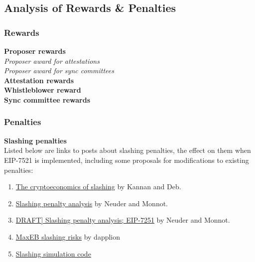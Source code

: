 \subsection{Analysis of Rewards \& Penalties}
\subsubsection{Rewards}

\textbf{Proposer rewards} \\
\noindent
\textit{Proposer award for attestations} \\


\noindent
\textit{Proposer award for sync committees} \\




\noindent
\textbf{Attestation rewards} \\



\noindent
\textbf{Whistleblower reward} \\


\noindent
\textbf{Sync committee rewards} \\


\subsubsection{Penalties}
\textbf{Slashing penalties} \\
\noindent
Listed below are links to posts about slashing penalties, the effect on them when EIP-7521 is implemented, including some proposals for modifications to existing penalties:
\begin{enumerate}
\item \href{https://a16zcrypto.com/posts/article/the-cryptoeconomics-of-slashing/}{The cryptoeconomics of slashing} by Kannan and Deb.
\item \href{https://ethresear.ch/t/slashing-penalty-analysis-eip-7251/16509}{Slashing penalty analysis} by Neuder and Monnot.
\item \href{https://notes.ethereum.org/@mikeneuder/slashings-eip-7251}{DRAFT] Slashing penalty analysis; EIP-7251} by Neuder and Monnot.
\item \href{https://hackmd.io/@dapplion/maxeb_slashing_risks}{MaxEB slashing risks} by dapplion
\item \href{https://colab.research.google.com/drive/1lBe4qH4oqI8D9cmcQGca3O1AdR3SVr5z?usp=sharing#scrollTo=Hiw1NPEZIQVi}{Slashing simulation code}
\end{enumerate}


